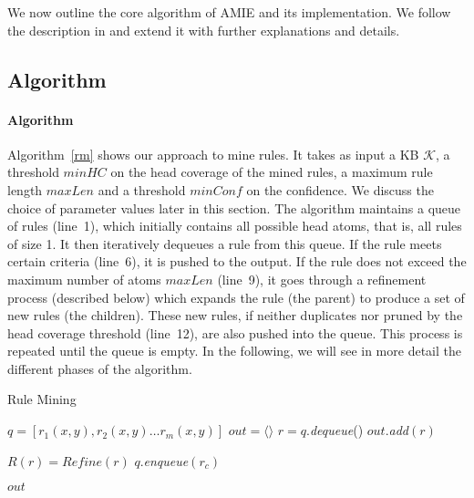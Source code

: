 
We now outline the core algorithm of AMIE and its implementation.
We follow the description in \cite{amie} and extend it with further explanations and details.

\subsection{Algorithm}
\label{subsec:algorithm}

\paragraph{Algorithm} Algorithm~\ref{rm} shows our approach to mine rules. It takes as input a KB $\mathcal{K}$, 
a threshold $minHC$ on the head coverage of the mined rules, a maximum rule length $maxLen$
and a threshold $minConf$ on the confidence. We discuss the choice of parameter values later in this section.
The algorithm maintains a queue of rules (line~1), which initially contains all possible head atoms, that is, all rules of size 1.
It then iteratively dequeues a rule from this queue.
If the rule meets certain criteria (line~6), it is pushed to the output.
If the rule does not exceed the maximum number of atoms $maxLen$ (line~9), it goes through a refinement process (described below) which
expands the rule (the parent) to produce a set of new rules (the children). These new rules, 
if neither duplicates nor pruned by the head coverage threshold (line~12),  
are also pushed into the queue.
This process is repeated until the queue is empty. 
In the following, we will see in more detail the different phases of the algorithm.

\begin{algorithm}
\caption{Rule Mining}
\label{rm}
\begin{algorithmic}[1]
    \State $q = [r_1(x,y), r_2(x,y) \dots r_m(x,y)] $
    \State $out = \langle \rangle$
	  \State $r = q.$\emph{dequeue}()
	      \State $out.$\emph{add}$(r)$	
	  \EndIf
	  
	    \State $R(r) = Refine(r)$	    
			\State $q.$\emph{enqueue}$(r_c)$		      
		    \EndIf
	    \EndFor
	    
	  \EndIf  
	  
	\EndWhile
    \State \Return $out$
\EndFunction
\end{algorithmic}
\end{algorithm}

